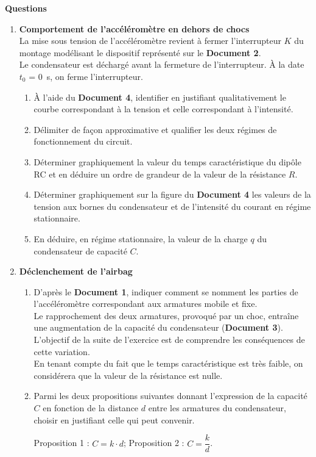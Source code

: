 \documentclass[a4paper,11pt,fleqn]{scrartcl}%
\begin{document}
	\textbf{Questions}
\begin{enumerate}
	\item \textbf{Comportement de l'accéléromètre en dehors de chocs}\\
	La mise sous tension de l'accéléromètre revient à fermer l'interrupteur $K$ du montage modélisant le dispositif représenté sur le \textbf{Document 2}.\\
	Le condensateur est déchargé avant la fermeture de l'interrupteur. À la date $t_0$ = \SI{0}{\second}, on ferme l'interrupteur.
	\begin{enumerate}
		\item À l'aide du \textbf{Document 4}, identifier en justifiant qualitativement le courbe correspondant à la tension et celle correspondant à l'intensité.
		\item Délimiter de façon approximative et qualifier les deux régimes de fonctionnement du circuit.
		\item Déterminer graphiquement la valeur du temps caractéristique du dipôle RC et en déduire un ordre de grandeur de la valeur de la résistance $R$.
		\item Déterminer graphiquement sur la figure du \textbf{Document 4} les valeurs de la tension aux bornes du condensateur et de l'intensité du courant en régime stationnaire.
		\item En déduire, en régime stationnaire, la valeur de la charge $q$ du condensateur de capacité $C$.
	\end{enumerate}
	\item \textbf{Déclenchement de l'airbag}
	\begin{enumerate}
		\item D'après le \textbf{Document 1}, indiquer comment se nomment les parties de l'accéléromètre correspondant aux armatures mobile et fixe.\\
		Le rapprochement des deux armatures, provoqué par un choc, entraîne une augmentation de la capacité du condensateur (\textbf{Document 3}). L'objectif de la suite de l'exercice est de comprendre les conséquences de cette variation.\\
		En tenant compte du fait que le temps caractéristique est très faible, on considérera que la valeur de la résistance est nulle.
		\item Parmi les deux propositions suivantes donnant l'expression de la capacité $C$ en fonction de la distance $d$ entre les armatures du condensateur, choisir en justifiant celle qui peut convenir.
		\begin{center}Proposition 1 : $C=k\cdot d$; \hspace{2cm} Proposition 2 : $C=\dfrac{k}{d}$.\end{center}

\end{enumerate}
\end{enumerate}
\end{document}
